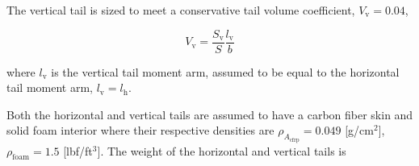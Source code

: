 % 
% 
% 
% 
% 
% 

The vertical tail is sized to meet a conservative tail volume coefficient, $V_{\text{v}}= 0.04$,\cite{aircraftrules}

\begin{equation}
    \label{e:vtv}
    V_{\text{v}} = \frac{S_{\text{v}}}{S} \frac{l_{\text{v}}}{b}
\end{equation}

where $l_{\text{v}}$ is the vertical tail moment arm, assumed to be equal to the horizontal tail moment arm, $l_{\text{v}} = l_{\text{h}}$.

Both the horizontal and vertical tails are assumed to have a carbon fiber skin and solid foam interior where their respective densities are $\rho_{A_{\text{cfrp}}} = 0.049$ [g/cm$^2$], $\rho_{\text{foam}} = 1.5$ [lbf/ft$^3$]. 
The weight of the horizontal and vertical tails is


